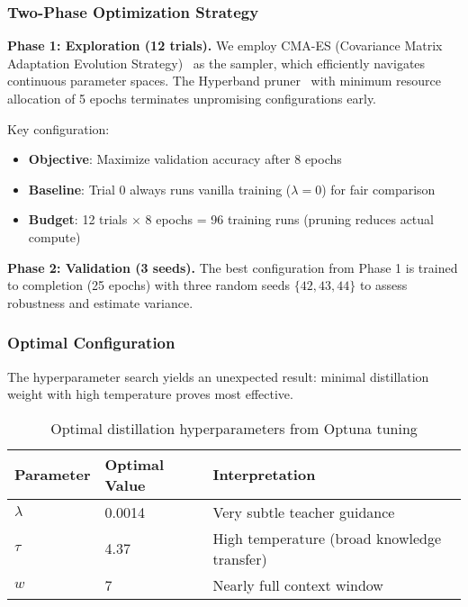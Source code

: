 \subsubsection{Two-Phase Optimization Strategy}

\textbf{Phase 1: Exploration (12 trials).} We employ CMA-ES (Covariance Matrix Adaptation Evolution Strategy)~\cite{hansenCMAEvolutionStrategy2023} as the sampler, which efficiently navigates continuous parameter spaces. The Hyperband pruner~\cite{liHyperbandNovelBanditBased2018} with minimum resource allocation of 5 epochs terminates unpromising configurations early.

Key configuration:
\begin{itemize}[noitemsep,topsep=0pt]
    \item \textbf{Objective}: Maximize validation accuracy after 8 epochs
    \item \textbf{Baseline}: Trial 0 always runs vanilla training ($\lambda = 0$) for fair comparison
    \item \textbf{Budget}: 12 trials $\times$ 8 epochs = 96 training runs (pruning reduces actual compute)
\end{itemize}

\textbf{Phase 2: Validation (3 seeds).} The best configuration from Phase 1 is trained to completion (25 epochs) with three random seeds $\{42, 43, 44\}$ to assess robustness and estimate variance.

\subsubsection{Optimal Configuration}

The hyperparameter search yields an unexpected result: minimal distillation weight with high temperature proves most effective.

\begin{table}[h]
    \centering
    \caption{Optimal distillation hyperparameters from Optuna tuning}
    \label{tab:optimal-hparams}
    \small
    \begin{tabular}{lll}
        \toprule
        \textbf{Parameter} & \textbf{Optimal Value} & \textbf{Interpretation}                     \\
        \midrule
        $\lambda$          & 0.0014                 & Very subtle teacher guidance                \\
        $\tau$             & 4.37                   & High temperature (broad knowledge transfer) \\
        $w$                & 7                      & Nearly full context window                  \\
        \bottomrule
    \end{tabular}
\end{table}

